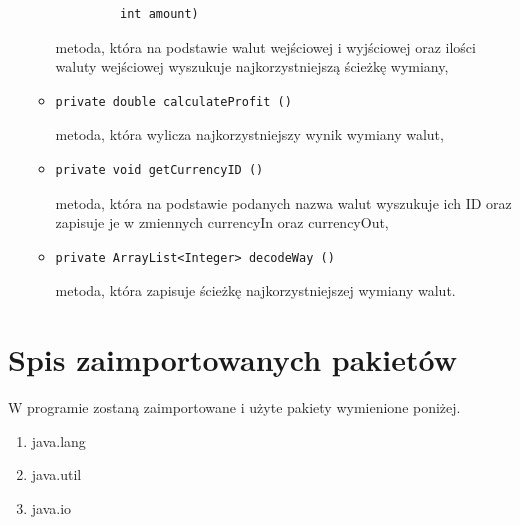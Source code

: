 ﻿\documentclass[12pt]{article}
\begin{document}
\begin{enumerate}
\begin{itemize}
\begin{verbatim}
         int amount)\end{verbatim}
        metoda, która na podstawie walut wejściowej i wyjściowej oraz ilości waluty wejściowej wyszukuje najkorzystniejszą ścieżkę wymiany,
         \item \begin{verbatim}private double calculateProfit ()\end{verbatim}
        metoda, która wylicza najkorzystniejszy wynik wymiany walut,
        \item \begin{verbatim}private void getCurrencyID ()\end{verbatim}
        metoda, która na podstawie podanych nazwa walut wyszukuje ich ID oraz zapisuje je w zmiennych currencyIn oraz currencyOut,
        \item \begin{verbatim}private ArrayList<Integer> decodeWay ()\end{verbatim}
        metoda, która zapisuje ścieżkę najkorzystniejszej wymiany walut.
        
    \end{itemize}
\end{enumerate}

\section{Spis zaimportowanych pakietów}
W programie zostaną zaimportowane i użyte pakiety wymienione poniżej. 
\begin{enumerate}
    \item java.lang
    \item java.util
    \item java.io
    
\end{enumerate}
\end{document}
